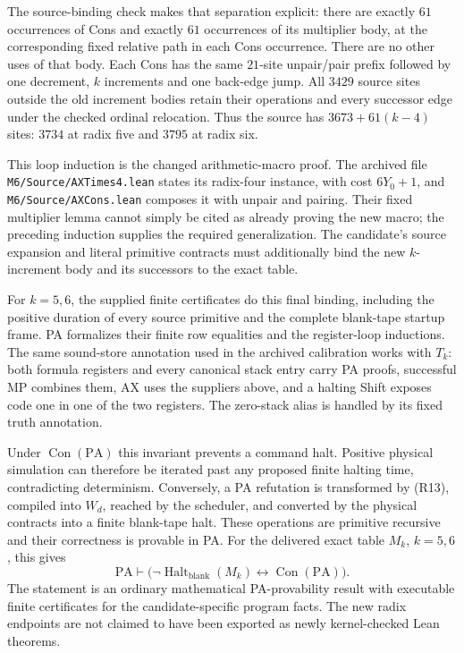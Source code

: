 The source-binding check makes that separation explicit: there are
exactly $61$ occurrences of Cons and exactly $61$ occurrences of its
multiplier body, at the corresponding fixed relative path in each
Cons occurrence. There are no other uses of that body. Each Cons
has the same $21$-site unpair/pair prefix followed by one decrement,
$k$ increments and one back-edge jump. All $3429$ source sites
outside the old increment bodies retain their operations and every
successor edge under the checked ordinal relocation. Thus the source
has $3673+61(k-4)$ sites: $3734$ at radix five and $3795$ at radix six.

This loop induction is the changed arithmetic-macro proof. The
archived file \nolinkurl{M6/Source/AXTimes4.lean} states its radix-four
instance, with cost $6Y_0+1$, and
\nolinkurl{M6/Source/AXCons.lean} composes it with unpair and pairing.
Their fixed multiplier lemma cannot simply be cited as already
proving the new macro; the preceding induction supplies the required
generalization. The candidate's source expansion and literal
primitive contracts must additionally bind the new $k$-increment
body and its successors to the exact table.

For $k=5,6$, the supplied finite certificates do this final binding,
including the positive duration of every source primitive and the
complete blank-tape startup frame. PA formalizes their finite row
equalities and the register-loop inductions. The same sound-store
annotation used in the archived calibration works with $T_k$:
both formula registers and every canonical stack entry carry PA
proofs, successful MP combines them, AX uses the suppliers above,
and a halting Shift exposes code one in one of the two registers.
The zero-stack alias is handled by its fixed truth annotation.

Under $\operatorname{Con}(\mathrm{PA})$ this invariant prevents a
command halt. Positive physical simulation can therefore be
iterated past any proposed finite halting time, contradicting
determinism. Conversely, a PA refutation is transformed by (R13),
compiled into $W_d$, reached by the scheduler, and converted by the
physical contracts into a finite blank-tape halt. These operations
are primitive recursive and their correctness is provable in PA.
For the delivered exact table $M_k$, $k=5,6$, this gives
\[
 \boxed{\quad
 \mathrm{PA}\vdash
   \bigl(\neg\operatorname{Halt}_{\mathrm{blank}}(M_k)
          \leftrightarrow\operatorname{Con}(\mathrm{PA})\bigr).
 \quad}                                                \tag{R14}
\]
The statement is an ordinary mathematical PA-provability result
with executable finite certificates for the candidate-specific
program facts. The new radix endpoints are not claimed to have
been exported as newly kernel-checked Lean theorems.